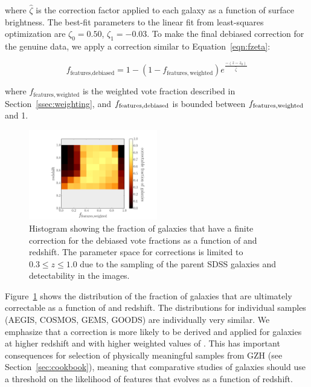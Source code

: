 \documentclass[a4paper,fleqn,usenatbib]{mnras}
\begin{document}
\noindent where $\hat\zeta$ is the correction factor applied to each galaxy as
a function of surface brightness. The best-fit parameters to the linear fit
from least-squares optimization are $\zeta_0=0.50$, $\zeta_1=-0.03$. To make the
final debiased correction for the genuine \hst{} data, we apply a 
correction similar to Equation~\ref{eqn:fzeta}:

\begin{equation}
f_\textrm{features,debiased} = 1 - (1 - f_\mathrm{features,weighted})e^{\frac{-(z-z_0)}{\hat\zeta}}
\label{eqn:fzeta_mod}
\end{equation}

\noindent where $f_\mathrm{features,weighted}$ is the weighted vote fraction
described in Section~\ref{ssec:weighting}, and $f_{\rm features,debiased}$ is bounded 
between $f_{\rm features,weighted}$ and 1. 

\begin{figure}
\center
\includegraphics[width=0.5\textwidth]{figures/correctable_fraction.pdf}
\caption{Histogram showing the fraction of galaxies that have a finite correction
for the debiased vote fractions \ffeaturesdebiased{} as a function of \ffeatures{}
and redshift. The parameter space for corrections is limited to $0.3 \leq z \leq 1.0$
due to the sampling of the parent SDSS galaxies and detectability in the \ferengi{} images.
}
\label{fig:correctable_fraction}
\end{figure}

Figure~\ref{fig:correctable_fraction} shows the
distribution of the fraction of galaxies that are ultimately correctable as a function
of \ffeatures{} and redshift. The distributions for individual samples (AEGIS, COSMOS,
GEMS, GOODS) are individually very similar. We emphasize that a correction is more likely to be derived
and applied for galaxies at higher redshift and with higher weighted values of \ffeatures.
This has important consequences for selection of physically meaningful samples from GZH
(see Section~\ref{sec:cookbook}), meaning that comparative studies of galaxies
should use a threshold on the likelihood of features that evolves as a function of redshift.
\end{document}
